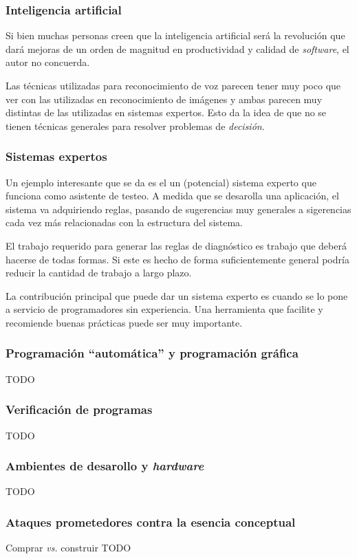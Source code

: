 \documentclass{beamer}
\begin{document}
\begin{frame}[fragile]
  \frametitle{Inteligencia artificial}
  Si bien muchas personas creen que la inteligencia artificial ser\'a la
  revoluci\'on que dar\'a mejoras de un orden de magnitud en productividad
  y calidad de \textit{software}, el autor no concuerda.

  Las t\'ecnicas utilizadas para reconocimiento de voz parecen tener muy
  poco que ver con las utilizadas en reconocimiento de im\'agenes y ambas
  parecen muy distintas de las utilizadas en sistemas expertos.
  Esto da la idea de que no se tienen t\'ecnicas generales para resolver
  problemas de \textit{decisi\'on}.
\end{frame}


\begin{frame}[fragile]
  \frametitle{Sistemas expertos}

  Un ejemplo interesante que se da es el un (potencial) sistema experto que
  funciona como asistente de testeo.
  A medida que se desarolla una aplicaci\'on, el sistema va adquiriendo reglas,
  pasando de sugerencias muy generales a sigerencias cada vez m\'as relacionadas
  con la estructura del sistema.

  El trabajo requerido para generar las reglas de diagn\'ostico es trabajo
  que deber\'a hacerse de todas formas. Si este es hecho de forma suficientemente
  general podr\'ia reducir la cantidad de trabajo a largo plazo.

  La contribuci\'on principal que puede dar un sistema experto es cuando se lo
  pone a servicio de programadores sin experiencia. Una herramienta que facilite
  y recomiende buenas pr\'acticas puede ser muy importante.
\end{frame}

\begin{frame}[fragile]
  \frametitle{Programaci\'on ``autom\'atica'' y programaci\'on gr\'afica}

  TODO
\end{frame}


\begin{frame}[fragile]
  \frametitle{Verificaci\'on de programas}
  TODO
\end{frame}

\begin{frame}[fragile]
  \frametitle{Ambientes de desarollo y \textit{hardware}}
  TODO
\end{frame}


\begin{frame}[fragile]
  \frametitle{Ataques prometedores contra la esencia conceptual}
  Comprar \textit{vs.} construir
  TODO
\end{frame}
\end{document}
